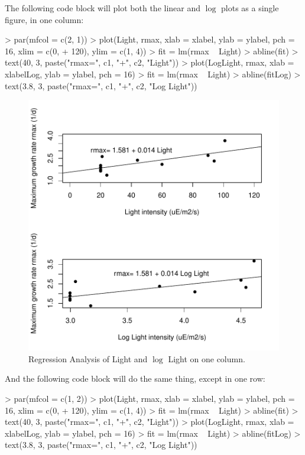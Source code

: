 \documentclass[11pt, oneside, reqno]{article}
\begin{document}
The following code block will plot both the linear and $\log$ plots as a single figure, in one column:

\begin{Schunk}
\begin{Sinput}
> par(mfcol = c(2, 1))
> plot(Light, rmax, xlab = xlabel, ylab = ylabel, pch = 16, xlim = c(0, 
+     120), ylim = c(1, 4))
> fit = lm(rmax ~ Light)
> abline(fit)
> text(40, 3, paste("rmax=", c1, "+", c2, "Light"))
> plot(LogLight, rmax, xlab = xlabelLog, ylab = ylabel, pch = 16)
> fit = lm(rmax ~ Light)
> abline(fitLog)
> text(3.8, 3, paste("rmax=", c1, "+", c2, "Log Light"))
\end{Sinput}
\end{Schunk}

\begin{figure}
\begin{center}
\includegraphics{exercises-LightOneColumn}
\end{center}
\caption{Regression Analysis of Light and $\log$ Light on one column.}
\label{fig:LightOneColumn}
\end{figure}

And the following code block will do the same thing, except in one row:

\begin{Schunk}
\begin{Sinput}
> par(mfcol = c(1, 2))
> plot(Light, rmax, xlab = xlabel, ylab = ylabel, pch = 16, xlim = c(0, 
+     120), ylim = c(1, 4))
> fit = lm(rmax ~ Light)
> abline(fit)
> text(40, 3, paste("rmax=", c1, "+", c2, "Light"))
> plot(LogLight, rmax, xlab = xlabelLog, ylab = ylabel, pch = 16)
> fit = lm(rmax ~ Light)
> abline(fitLog)
> text(3.8, 3, paste("rmax=", c1, "+", c2, "Log Light"))
\end{Sinput}
\end{Schunk}
\end{document}
